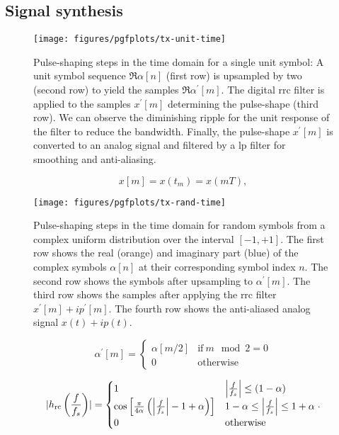 \subsection{Signal synthesis}

\begin{figure}[htb]
	\centering
	\texttt{[image: figures/pgfplots/tx-unit-time]}
	\caption{Pulse-shaping steps in the time domain for a single unit symbol: A unit symbol sequence $\Re\alpha[n]$ (first row) is upsampled by two (second row) to yield the samples $\Re\alpha^\prime[m]$. The digital \gls{rrc} filter is applied to the samples $x^\prime[m]$ determining the pulse-shape (third row). We can observe the diminishing ripple for the unit response of the filter to reduce the bandwidth. Finally, the pulse-shape $x^\prime[m]$ is converted to an analog signal and filtered by a \gls{lp} filter for smoothing and anti-aliasing.}\label{fig:pulse_shaping_unit_time}
\end{figure}

\begin{equation}
	x[m]
	=
	x(t_m)
	=
	x(mT)
	,
\end{equation}

\begin{figure}[htb]
	\centering
	\texttt{[image: figures/pgfplots/tx-rand-time]}
	\caption{Pulse-shaping steps in the time domain for random symbols from a complex uniform distribution over the interval $[-1,+1]$. The first row shows the real (orange) and imaginary part (blue) of the complex symbols $\alpha[n]$ at their corresponding symbol index $n$. The second row shows the symbols after upsampling to $\alpha^\prime[m]$. The third row shows the samples after applying the \gls{rrc} filter $x^\prime[m]+ip^\prime[m]$. The fourth row shows the anti-aliased analog signal $x(t)+ip(t)$.}\label{fig:pulse_shaping_rand_time}
\end{figure}

\begin{equation}
	\alpha^\prime[m]
	=
	\begin{cases}
		\alpha[m/2] & \text{if}\ m\mod2=0 \\
		0 & \text{otherwise}
	\end{cases}
\end{equation}

\begin{equation}
	\abs{h_\text{rc}\left(\frac{f}{f_s}\right)}
	=
	\begin{cases}
		1 & \abs*{\frac{f}{f_s}}\leq(1-\alpha) \\
		\cos\left[\frac{\pi}{4\alpha}\left(\abs*{\frac{f}{f_s}}-1+\alpha\right)\right] & 1-\alpha\leq\abs*{\frac{f}{f_s}}\leq1+\alpha \\
		0 & \text{otherwise}
	\end{cases}
	.
\end{equation}

